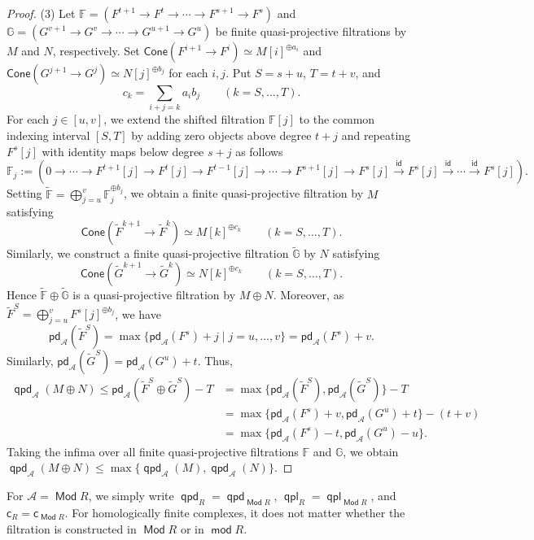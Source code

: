 \documentclass[10pt, a4paper,reqno]{amsart}
\theoremstyle{definition}
\theoremstyle{remark}
\numberwithin{equation}{thm}
\def\FF{\mathbb{F}}
\def\GG{\mathbb{G}}
\def\cA{\mathcal{A}}
\def\c{\mathsf{c}}
\def\mod{\operatorname{\mathsf{mod}}}
\def\Mod{\operatorname{\mathsf{Mod}}}
\def\Cone{\mathsf{Cone}}
\def\pd{\mathsf{pd}}
\def\id{\operatorname{\mathsf{id}}}
\def\qpd{\operatorname{\mathsf{qpd}}}
\def\qpl{\operatorname{\mathsf{qpl}}}
\begin{document}
\begin{proof}
(3) Let
$\FF=(F^{t+1}\to F^t\to\cdots\to F^{s+1}\to F^s)$ and $\GG=(G^{v+1}\to G^v\to\cdots\to G^{u+1}\to G^u)$
be finite quasi-projective filtrations by $M$ and $N$, respectively.
Set $\Cone(F^{i+1} \to F^{i}) \simeq M[i]^{\oplus a_i}$ and $\Cone(G^{j+1} \to G^{j}) \simeq N[j]^{\oplus b_j}$ for each $i,j$.
Put $S=s+u$, $T=t+v$, and
\[
c_k=\sum_{i+j=k}a_ib_j \qquad(k = S, \ldots, T).
\]
For each $j \in [u,v]$, we extend the shifted filtration $\FF[j]$ to the common indexing interval $[S,T]$ by adding zero objects above degree $t+j$ and repeating $F^s[j]$ with identity maps below degree $s+j$ as follows
\[
\FF_j := (0 \to \cdots \to F^{t+1}[j] \to F^{t}[j] \to F^{t-1}[j] \to \cdots \to  F^{s+1}[j] \to F^{s}[j] \xrightarrow{\id} F^{s}[j] \xrightarrow{\id} \cdots \xrightarrow{\id} F^{s}[j]).
\]
Setting $\widetilde{\FF} = \bigoplus_{j=u}^v \FF_j^{\oplus b_j}$, we obtain a finite quasi-projective filtration by $M$ satisfying 
\[
\Cone(\widetilde{F}^{k+1} \to \widetilde{F}^k) \simeq M[k]^{\oplus c_k} \qquad(k = S, \ldots, T).
\]
Similarly, we construct a finite quasi-projective filtration $\widetilde{\GG}$ by $N$ satisfying  
\[
\Cone(\widetilde{G}^{k+1} \to \widetilde{G}^k) \simeq N[k]^{\oplus c_k} \qquad(k = S, \ldots, T).
\]
Hence $\widetilde{\FF} \oplus \widetilde{\GG}$ is a quasi-projective filtration by $M \oplus N$.
Moreover, as $\widetilde{F}^S = \bigoplus_{j=u}^v F^{s}[j]^{\oplus b_j}$, we have 
\[
\pd_\cA(\widetilde{F}^S) = \max\{\pd_\cA(F^s) + j \mid j = u, \ldots, v\} = \pd_\cA(F^s) + v.
\]
Similarly, $\pd_\cA(\widetilde{G}^S) = \pd_\cA(G^u) + t$.
Thus, 
\begin{align*}
\qpd_\cA(M \oplus N) \le \pd_\cA(\widetilde{F}^S \oplus \widetilde{G}^S) - T 
&= \max\{\pd_\cA(\widetilde{F}^S), \pd_\cA(\widetilde{G}^S)\} - T \\
&= \max\{\pd_\cA(F^s) + v, \pd_\cA(G^u) + t\} - (t+v)\\
&= \max\{\pd_\cA(F^s) -t, \pd_\cA(G^u) -u\}.
\end{align*}
Taking the infima over all finite quasi-projective filtrations $\FF$ and $\GG$, we obtain $\qpd_\cA(M \oplus N) \le \max\{\qpd_\cA(M), \qpd_\cA(N)\}$.
\end{proof}


For $\cA = \Mod R$, we simply write $\qpd_R = \qpd_{\Mod R}$, $\qpl_R = \qpl_{\Mod R}$, and $\c_R = \c_{\Mod R}$.
For homologically finite complexes, it does not matter whether the filtration is constructed in $\Mod R$ or in $\mod R$.
\end{document}
